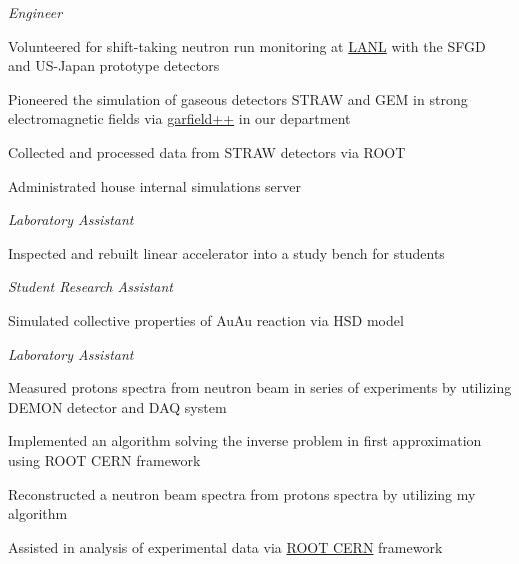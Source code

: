 \documentclass[
  a4paper, 
   maincolor=cvblue,
   sectioncolor=cvblue,
]{fortysecondscv}
\begin{document}
\begin{cvtable}
	{\textit{Engineer}
	\normalsize 
	\begin{itemize-noindent}
		\item Volunteered for shift-taking neutron run monitoring at \href{https://www.lanl.gov}{LANL} with the SFGD and US-Japan prototype detectors
		\item Pioneered the simulation of gaseous detectors STRAW and GEM in strong electromagnetic fields via \href{https://garfieldpp.web.cern.ch/garfieldpp/}{garfield++} in our department
		\item Collected and processed data from STRAW detectors via ROOT
		\item Administrated house internal simulations server %
	\end{itemize-noindent}
	}
	
	{\textit{Laboratory Assistant}
	\normalsize
	\begin{itemize-noindent}
		\item Inspected and rebuilt linear accelerator into a study bench for students
	\end{itemize-noindent}
	}
	
	{\textit{Student Research Assistant}
	\normalsize
	\begin{itemize-noindent}
		\item Simulated collective properties of AuAu reaction via HSD model
	\end{itemize-noindent}
	}	
	
	{\textit{Laboratory Assistant}
	\normalsize
	\begin{itemize-noindent}
		\item Measured protons spectra from neutron beam in series of experiments by utilizing DEMON detector and DAQ system
		\item Implemented an algorithm solving the inverse problem in first approximation using ROOT CERN framework
		\item Reconstructed a neutron beam spectra from protons spectra by utilizing my algorithm
		\item Assisted in analysis of experimental data via \href{https://root.cern/}{ROOT CERN} framework
	\end{itemize-noindent}
	}
	
\end{cvtable}
\end{document}
